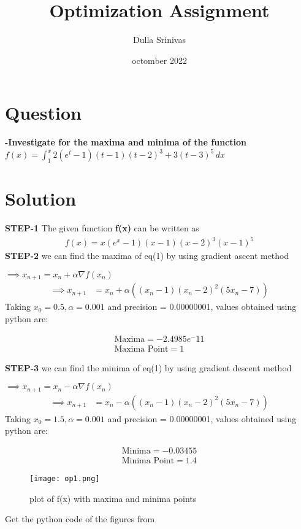 \documentclass[journal,12pt,twocolumn]{IEEEtran}
\title{\textbf{Optimization Assignment }}
\author{Dulla Srinivas}
\date{octomber 2022}
\providecommand{\brak}[1]{\ensuremath{\left(#1\right)}}
\begin{document}
\maketitle

\section{Question}
\textbf{-Investigate for the maxima and minima of the function
 $f(x)=\int_{1}^{x}2(e^t-1)(t-1)(t-2)^3+3(t-3)^5 \,dx$}
 
 \section{Solution}
 \textbf{STEP-1}
 The given function \textbf{f(x)} can be written as
 \begin{align}
 f(x)=x(e^x-1)(x-1)(x-2)^3(x-1)^5
 \end{align}
 \textbf{STEP-2}
 we can find the maxima of eq(1) by using gradient ascent method
 
$\implies x_{n+1} = x_n + \alpha \nabla f(x_n) $\\
 \begin{align}
        \implies x_{n+1} &= x_n + \alpha \brak{(x_n-1)(x_n-2)^2(5x_n-7)}
    \end{align}
 Taking $x_0=0.5,\alpha=0.001$ and precision = 0.00000001, values obtained using python are:
    
    \begin{align}
        \boxed{\text{Maxima} = -2.4985e^-11}\\
        \boxed{\text{Maxima Point} = 1}
    \end{align}
 
 \textbf{STEP-3}
 we can find the minima of eq(1) by using gradient descent method
 
$\implies x_{n+1} = x_n - \alpha \nabla f(x_n) $\\
 \begin{align}
        \implies x_{n+1} &= x_n - \alpha \brak{(x_n-1)(x_n-2)^2(5x_n-7)}
    \end{align}
Taking $x_0=1.5,\alpha=0.001$ and precision = 0.00000001, values obtained using python are:
    
    \begin{align}
        \boxed{\text{Minima} =-0.03455}\\
        \boxed{\text{Minima Point} = 1.4}
    \end{align}
\begin{figure}[h!]
\centering
\texttt{[image: op1.png]}  \\
\caption{plot of f(x) with maxima and minima points}
\end{figure}
    
Get the python code of the figures from
\begin{table}[h]
\large
\centering
{}

\end{table}
 
\end{document}
